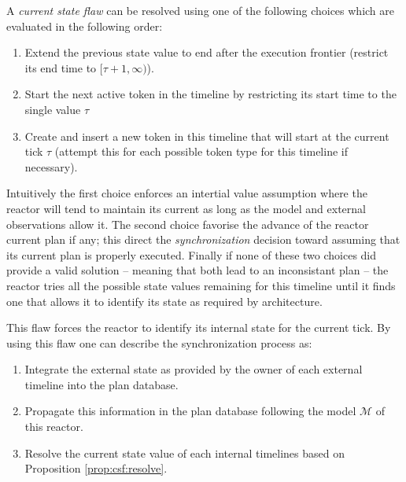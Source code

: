 \begin{proposition}
  \label{prop:csf:resolve}
  A {\em current state flaw} can be resolved using one of the
  following choices which are evaluated in the following order:

  \begin{enumerate}

  \item Extend the previous state value to end after the execution 
    frontier  (\ie restrict its end time to $[\tau+1, \infty)$). %

  \item Start the next active token in the timeline by restricting its
    start time to the single value $\tau$

  \item Create and insert a new token in this timeline that will start
    at the current tick $\tau$ (attempt this for each possible token
    type for this timeline if necessary).

\end{enumerate}
\end{proposition}
Intuitively the first choice enforces an intertial value assumption
where the reactor will tend to maintain its current as long as the
model and external observations allow it. The second choice favorise
the advance of the reactor current plan if any; this direct the {\em
  synchronization} decision toward assuming that its current plan is
properly executed. Finally if none of these two choices did provide a
valid solution -- meaning that both lead to an inconsistant plan --
the reactor tries all the possible state values remaining for this
timeline until it finds one that allows it to identify its state as
required by \rx architecture.

This flaw forces the reactor to identify its internal state
for the current tick. By using this flaw one can describe the
synchronization process as:

\begin{enumerate}
\item Integrate the external state as provided by the owner of each
  external timeline into the plan database.
\item Propagate this information in the plan database following the
  model $\mathcal{M}$ of this reactor.
\item Resolve the current state value of each internal timelines based
  on Proposition \ref{prop:csf:resolve}.
\end{enumerate}

